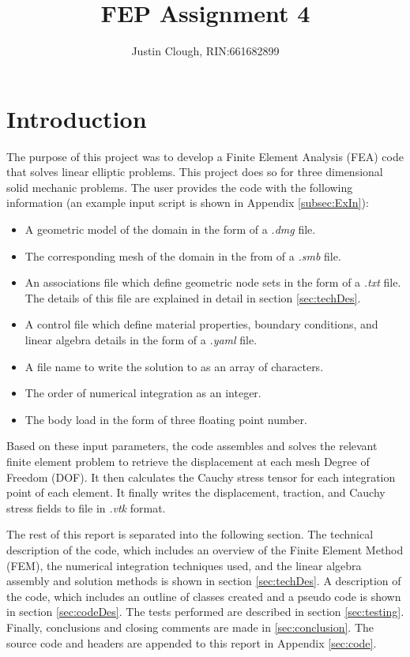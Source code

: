\documentclass[a4paper, 12pt]{article}
\author{Justin Clough, RIN:661682899}
\title{FEP Assignment 4}
\begin{document}
\maketitle

\newpage
\section{Introduction} \label{sec:intro}
The purpose of this project was to develop a Finite
Element Analysis (FEA) code that solves linear
elliptic problems. This project does so for
three dimensional solid mechanic problems. The user
provides the code with the following information
(an example input script is shown in
Appendix \ref{subsec:ExIn}):

\begin{itemize}
  \item A geometric model of the domain in the
        form of a \emph{.dmg} file.
  \item The corresponding mesh of the domain in the
        from of a \emph{.smb} file.
  \item An associations file which define geometric
        node sets in the form of a \emph{.txt} file. The
        details of this file are explained in detail in
        section \ref{sec:techDes}.
  \item A control file which define material properties,
        boundary conditions, and linear algebra details in
        the form of a \emph{.yaml} file.
  \item A file name to write the solution to as an array of
        characters.
  \item The order of numerical integration as an integer.
  \item The body load in the form of three floating point
        number.
\end{itemize}

Based on these input parameters, the code assembles and
solves the relevant finite element problem to retrieve
the displacement at each mesh Degree of Freedom (DOF).
It then calculates the Cauchy stress tensor for each
integration point of each element. It finally writes
the displacement, traction, and Cauchy stress fields to
file in \emph{.vtk} format.

The rest of this report is separated into the following
section. The technical description of the code, which
includes an overview of the Finite Element Method (FEM),
the numerical integration techniques used, and the
linear algebra assembly and solution methods is shown in
section \ref{sec:techDes}. A description of the code, which
includes an outline of classes created and a pseudo code
is shown in section \ref{sec:codeDes}. The tests performed
are described in section \ref{sec:testing}. Finally,
conclusions and closing comments are made
in \ref{sec:conclusion}. The source code and headers
are appended to this report in Appendix \ref{sec:code}.
\end{document}
